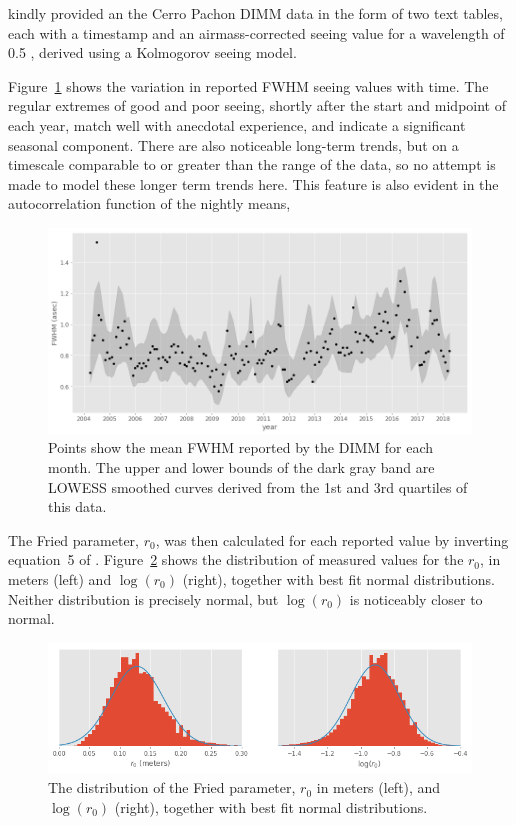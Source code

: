 \documentclass[\docopts]{\docclass}
\begin{document}
\cite{ebustos} kindly provided an the Cerro Pachon DIMM data in the
form of two text tables, each with a timestamp and an
airmass-corrected seeing value for a wavelength of 0.5 \micron,
derived using a Kolmogorov seeing
model.

Figure~\ref{fig:monthly-raw-dimm} shows the variation in
reported FWHM seeing values with time. The regular extremes of good
and poor seeing, shortly after the start and midpoint of each year,
match well with anecdotal experience, and indicate a significant
seasonal component. There are also noticeable long-term trends, but on
a timescale comparable to or greater than the range of the data, so no
attempt is made to model these longer term trends here. This feature
is also evident in the autocorrelation function of the nightly means,

\begin{figure}
  \includegraphics[width=\columnwidth]{monthly_raw_dimm.png}
  \caption{Points show the mean FWHM reported by the DIMM for each
    month. The upper and lower bounds of the dark gray band are
    LOWESS smoothed curves derived from the 1st and 3rd quartiles of
    this data.}
  \label{fig:monthly-raw-dimm}
\end{figure}

The Fried parameter, $r_0$, was then calculated for each reported
value by inverting equation~5 of \cite{2002PASP..114.1156T}.
Figure~\ref{fig:raw-r0-dist} shows the
distribution of measured values for the $r_0$, in meters (left) and
$\log(r_0)$ (right), together with best fit normal
distributions. Neither distribution is precisely normal, but $\log(
r_0)$ is noticeably closer to normal.

\begin{figure}
  \includegraphics[width=\columnwidth]{raw_r0_dist.png}
  \caption{The distribution of the Fried parameter, $r_0$ in meters
    (left), and $\log(r_0)$ (right), together with best fit normal
    distributions.}
  \label{fig:raw-r0-dist}
\end{figure}
\end{document}
